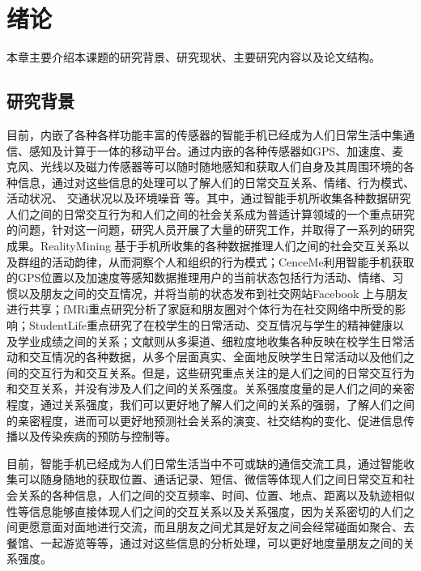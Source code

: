 \chapter{绪论}
本章主要介绍本课题的研究背景、研究现状、主要研究内容以及论文结构。

\section{研究背景}
目前，内嵌了各种各样功能丰富的传感器的智能手机已经成为人们日常生活中集通信、感知及计算于一体的移动平台。通过内嵌的各种传感器如GPS、加速度、麦克风、光线以及磁力传感器等可以随时随地感知和获取人们自身及其周围环境的各种信息，通过对这些信息的处理可以了解人们的日常交互关系、情绪、行为模式、活动状况、 交通状况以及环境噪音 等。其中，通过智能手机所收集各种数据研究人们之间的日常交互行为和人们之间的社会关系成为普适计算领域的一个重点研究的问题，针对这一问题，研究人员开展了大量的研究工作，并取得了一系列的研究成果。RealityMining 基于手机所收集的各种数据推理人们之间的社会交互关系以及群组的活动韵律，从而洞察个人和组织的行为模式；CenceMe利用智能手机获取的GPS位置以及加速度等感知数据推理用户的当前状态包括行为活动、情绪、习惯以及朋友之间的交互情况，并将当前的状态发布到社交网站Facebook 上与朋友进行共享；fMRi重点研究分析了家庭和朋友圈对个体行为在社交网络中所受的影响；StudentLife重点研究了在校学生的日常活动、交互情况与学生的精神健康以及学业成绩之间的关系；文献\cite{stopczynski2014measuring}则从多渠道、细粒度地收集各种反映在校学生日常活动和交互情况的各种数据，从多个层面真实、全面地反映学生日常活动以及他们之间的交互行为和交互关系。但是，这些研究重点关注的是人们之间的日常交互行为和交互关系，并没有涉及人们之间的关系强度。关系强度度量的是人们之间的亲密程度，通过关系强度，我们可以更好地了解人们之间的关系的强弱，了解人们之间的亲密程度，进而可以更好地预测社会关系的演变、社交结构的变化、促进信息传播以及传染疾病的预防与控制等。
\par 目前，智能手机已经成为人们日常生活当中不可或缺的通信交流工具，通过智能收集可以随身随地的获取位置、通话记录、短信、微信等体现人们之间日常交互和社会关系的各种信息，人们之间的交互频率、时间、位置、地点、距离以及轨迹相似性等信息能够直接体现人们之间的交互关系以及关系强度，因为关系密切的人们之间更愿意面对面地进行交流，而且朋友之间尤其是好友之间会经常碰面如聚合、去餐馆、一起游览等等，通过对这些信息的分析处理，可以更好地度量朋友之间的关系强度。

